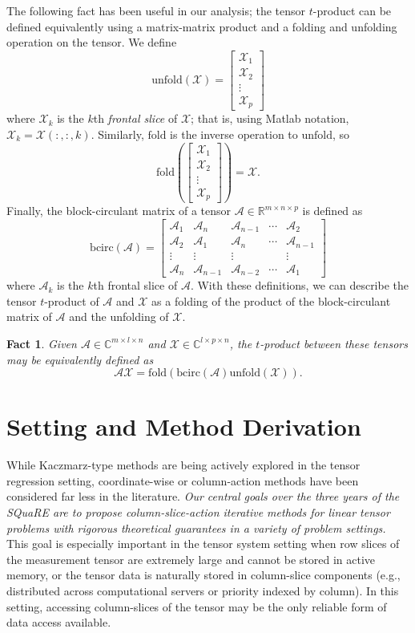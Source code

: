 \documentclass[10.5pt]{amsart}
\newtheorem{fact}{Fact}
\newcommand{\tens}[1]{\bm{\mathcal{#1}}}
\def\tA{{\tens{A}}}  %
\def\tX{{\tens{X}}}  %
\def\bcirc{{\text{bcirc}}}
\def\unfold{{\text{unfold}}}
\def\fold{{\text{fold}}}
\begin{document}
 The following fact has been useful in our analysis; the tensor $t$-product can be defined equivalently using a matrix-matrix product and a folding and unfolding operation on the tensor.  We define $$\unfold(\tX) = \begin{bmatrix} \tX_1 \\ \tX_2 \\ \vdots \\ \tX_p \end{bmatrix}$$ where $\tX_k$ is the $k$th \emph{frontal slice} of $\tX$; that is, using Matlab notation, $\tX_k = \tX(:,:,k).$  Similarly, $\fold$ is the inverse operation to $\unfold$, so $$\fold\left(\begin{bmatrix} \tX_1 \\ \tX_2 \\ \vdots \\ \tX_p \end{bmatrix}\right) = \tX.$$  Finally, the block-circulant matrix of a tensor $\tA \in \mathbb{R}^{m \times n \times p}$ is defined as $$\bcirc(\tA) = \begin{bmatrix} \tA_1 & \tA_n & \tA_{n-1} & \cdots & \tA_ 2 \\ \tA_2 & \tA_1 & \tA_n & \cdots & \tA_{n-1} \\ \vdots & \vdots & \vdots & & \vdots \\ \tA_n & \tA_{n-1} & \tA_{n-2} & \cdots & \tA_1 \end{bmatrix}$$ where $\tA_k$ is the $k$th frontal slice of $\tA$.  With these definitions, we can describe the tensor $t$-product of $\tA$ and $\tX$ as a folding of the product of the block-circulant matrix of $\tA$ and the unfolding of $\tX$.

\begin{fact}
    Given $\tens{A} \in \mathbb{C}^{m\times l \times n}$ and $\tens{X} \in \mathbb{C}^{l\times p \times n}$, the $t$-product between these tensors may be equivalently defined as $$\tA \tX = \fold(\bcirc(\tA) \unfold(\tX)).$$ \label{fact:tproduct}
\end{fact}

\section{Setting and Method Derivation}

While Kaczmarz-type methods are being actively explored in the tensor regression setting, coordinate-wise or column-action methods have been considered far less in the literature.  \emph{Our central goals over the three years of the SQuaRE are to propose column-slice-action iterative methods for linear tensor problems with rigorous theoretical guarantees in a variety of problem settings.}  This goal is especially important in the tensor system setting when row slices of the measurement tensor are extremely large and cannot be stored in active memory, or the tensor data is naturally stored in column-slice components (e.g., distributed across computational servers or priority indexed by column).  In this setting, accessing column-slices of the tensor may be the only reliable form of data access available.
\end{document}
